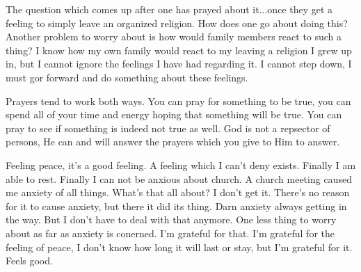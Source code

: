 The question which comes up after one has prayed about it...once they get a feeling
to simply leave an organized religion. How does one go about doing this? Another
problem to worry about is how would family members react to such a thing? I know how
my own family would react to my leaving a religion I grew up in, but I cannot ignore
the feelings I have had regarding it. I cannot step down, I must gor forward and do
something about these feelings.

Prayers tend to work both ways. You can pray for something to be true, you can spend
all of your time and energy hoping that something will be true. You can pray to see
if something is indeed not true as well. God is not a repsector of persons, He can
and will answer the prayers which you give to Him to answer.

Feeling peace, it's a good feeling. A feeling which I can't deny exists. Finally I am
able to rest. Finally I can not be anxious about church. A church meeting caused me
anxiety of all things. What's that all about? I don't get it. There's no reason for
it to cause anxiety, but there it did its thing. Darn anxiety always getting in the
way. But I don't have to deal with that anymore. One less thing to worry about as far
as anxiety is conerned. I'm grateful for that. I'm grateful for the feeling of peace,
I don't know how long it will last or stay, but I'm grateful for it. Feels good.
